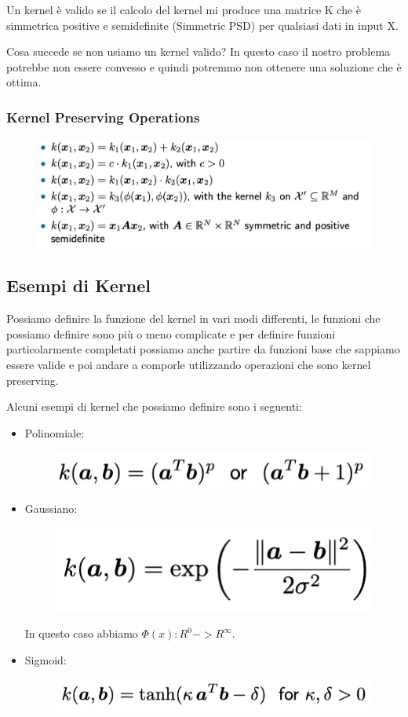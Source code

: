 \documentclass[14pt]{extreport}
\begin{document}
Un kernel è valido se il calcolo del kernel mi produce una matrice K che è simmetrica positive e semidefinite (Simmetric PSD) per qualsiasi dati in
input X.

Cosa succede se non usiamo un kernel valido? In questo caso il nostro problema potrebbe non essere convesso e quindi potremmo non ottenere una
soluzione che è ottima.

\subsubsection{Kernel Preserving Operations}

\begin{figure}[H]
	\centering
	\includegraphics[width=0.7\linewidth]{342.jpeg}
\end{figure}

\subsection{Esempi di Kernel}

Possiamo definire la funzione del kernel in vari modi differenti, le funzioni che possiamo definire sono più o meno complicate e per definire funzioni
particolarmente completati possiamo anche partire da funzioni base che sappiamo essere valide e poi andare a comporle utilizzando operazioni che sono
kernel preserving.

Alcuni esempi di kernel che possiamo definire sono i seguenti:

\begin{itemize}
	\item Polinomiale: \begin{figure}[H]
		      \centering
		      \includegraphics[width=0.5\linewidth]{343.jpeg}
	      \end{figure}
	\item Gaussiano:\begin{figure}[H]
		      \centering
		      \includegraphics[width=0.4\linewidth]{344.jpeg}
	      \end{figure}
	      In questo caso abbiamo $\Phi(x): R^0 -> R^\infty$.
	\item Sigmoid:\begin{figure}[H]
		      \centering
		      \includegraphics[width=0.5\linewidth]{345.jpeg}
	      \end{figure}
\end{itemize}
\end{document}

